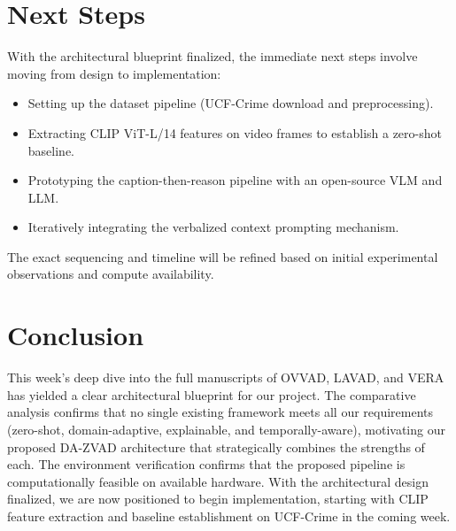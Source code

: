 \documentclass[12pt, a4paper]{article}
\begin{document}
\section{Next Steps}

With the architectural blueprint finalized, the immediate next steps involve moving from design to implementation:

\begin{itemize}[leftmargin=*]
    \item Setting up the dataset pipeline (UCF-Crime download and preprocessing).
    \item Extracting CLIP ViT-L/14 features on video frames to establish a zero-shot baseline.
    \item Prototyping the caption-then-reason pipeline with an open-source VLM and LLM.
    \item Iteratively integrating the verbalized context prompting mechanism.
\end{itemize}

The exact sequencing and timeline will be refined based on initial experimental observations and compute availability.

\section{Conclusion}

This week's deep dive into the full manuscripts of OVVAD, LAVAD, and VERA has yielded a clear architectural blueprint for our project. The comparative analysis confirms that no single existing framework meets all our requirements (zero-shot, domain-adaptive, explainable, and temporally-aware), motivating our proposed DA-ZVAD architecture that strategically combines the strengths of each. The environment verification confirms that the proposed pipeline is computationally feasible on available hardware. With the architectural design finalized, we are now positioned to begin implementation, starting with CLIP feature extraction and baseline establishment on UCF-Crime in the coming week.


\end{document}
